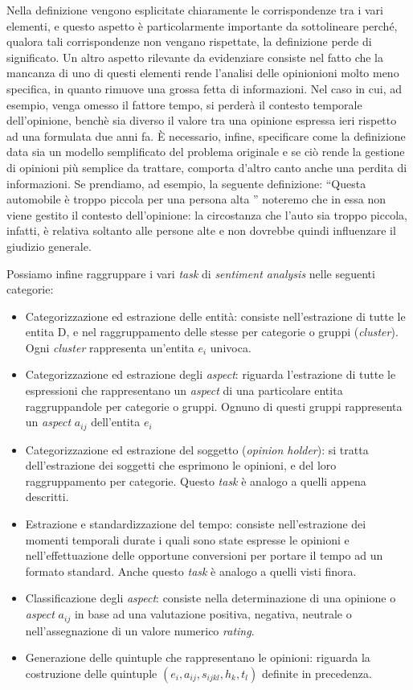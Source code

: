 \documentclass[a4paper,12pt,openright,twoside]{report}
\theoremstyle{definition}
\begin{document}
Nella definizione vengono esplicitate chiaramente le corrispondenze tra i vari elementi,
e questo aspetto è particolarmente importante da sottolineare perché, 
qualora tali corrispondenze non vengano rispettate,
la definizione perde di significato.
Un altro aspetto rilevante da evidenziare consiste nel fatto che la mancanza di uno di questi elementi rende 
l'analisi delle opinionioni molto meno specifica, in quanto rimuove una grossa fetta di
informazioni. Nel caso in cui, ad esempio, venga omesso il fattore tempo, si perderà il contesto
temporale dell'opinione, benchè sia diverso il valore tra una opinione espressa ieri rispetto ad una
formulata due anni fa.
\`E necessario, infine, specificare come la definizione data sia un modello semplificato del problema
originale e se ciò rende la gestione di opinioni più semplice da trattare,
comporta d'altro canto anche una perdita di informazioni. Se prendiamo, ad esempio, la seguente definizione:
``Questa automobile è troppo piccola per una persona alta ''
noteremo che in essa non viene gestito il contesto dell’opinione: la circostanza che l’auto sia troppo piccola, 
infatti, è relativa soltanto alle persone alte e non dovrebbe quindi influenzare il giudizio generale.

Possiamo infine raggruppare i vari \emph{task} di \emph{sentiment analysis} nelle seguenti categorie:
\begin{itemize}
	\item Categorizzazione ed estrazione delle entità: consiste nell'estrazione di tutte le entita D,
		e nel raggruppamento delle stesse per categorie o gruppi (\emph{cluster}). Ogni \emph{cluster}
		rappresenta un'entita $e_i$ univoca.
	\item Categorizzazione ed estrazione degli \emph{aspect}: riguarda l'estrazione di tutte le espressioni
		che rappresentano un \emph{aspect} di una particolare entita raggruppandole
		per categorie o gruppi. Ognuno di questi gruppi rappresenta un \emph{aspect} $a_{ij}$
		dell'entita $e_i$
	\item Categorizzazione ed estrazione del soggetto (\emph{opinion holder}): si tratta dell'estrazione
		dei soggetti che esprimono le opinioni, e del loro raggruppamento per categorie. Questo \emph{task}
		è analogo a quelli appena descritti.
	\item Estrazione e standardizzazione del tempo: consiste nell'estrazione dei momenti temporali 
		durate i quali 
		sono state espresse le opinioni e nell'effettuazione delle opportune conversioni per portare
		il tempo ad un formato standard. Anche questo \emph{task} è analogo a quelli visti finora.
	\item Classificazione degli \emph{aspect}: consiste nella determinazione di una opinione o \emph{aspect} $a_{ij}$
		in base ad una valutazione positiva, negativa, neutrale o nell'assegnazione di un valore numerico \emph{rating}.
	\item Generazione delle quintuple che rappresentano le opinioni: riguarda la costruzione delle quintuple 
		$(e_i, a_{ij}, s_{ijkl}, h_k, t_l)$ definite in precedenza.
\end{itemize}
\end{document}
